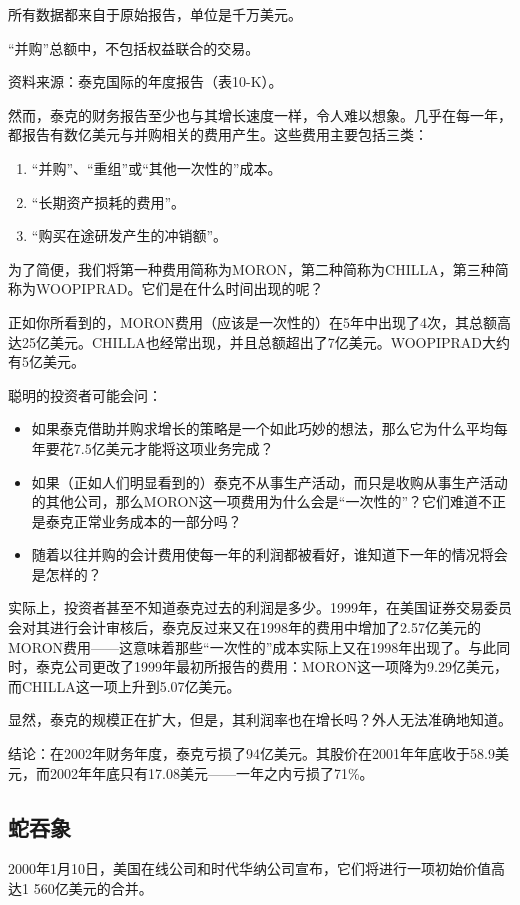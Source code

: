 \documentclass[12pt,oneside]{book}
\begin{document}
所有数据都来自于原始报告，单位是千万美元。

“并购”总额中，不包括权益联合的交易。

资料来源：泰克国际的年度报告（表10-K）。

然而，泰克的财务报告至少也与其增长速度一样，令人难以想象。几乎在每一年，都报告有数亿美元与并购相关的费用产生。这些费用主要包括三类：

\begin{enumerate}
\item “并购”、“重组”或“其他一次性的”成本。
\item “长期资产损耗的费用”。
\item “购买在途研发产生的冲销额”。
\end{enumerate}

为了简便，我们将第一种费用简称为MORON，第二种简称为CHILLA，第三种简称为WOOPIPRAD。它们是在什么时间出现的呢？

正如你所看到的，MORON费用（应该是一次性的）在5年中出现了4次，其总额高达25亿美元。CHILLA也经常出现，并且总额超出了7亿美元。WOOPIPRAD大约有5亿美元。

聪明的投资者可能会问：
\begin{itemize}
\item 如果泰克借助并购求增长的策略是一个如此巧妙的想法，那么它为什么平均每年要花7.5亿美元才能将这项业务完成？
\item 如果（正如人们明显看到的）泰克不从事生产活动，而只是收购从事生产活动的其他公司，那么MORON这一项费用为什么会是“一次性的”？它们难道不正是泰克正常业务成本的一部分吗？
\item 随着以往并购的会计费用使每一年的利润都被看好，谁知道下一年的情况将会是怎样的？
\end{itemize}

实际上，投资者甚至不知道泰克过去的利润是多少。1999年，在美国证券交易委员会对其进行会计审核后，泰克反过来又在1998年的费用中增加了2.57亿美元的MORON费用——这意味着那些“一次性的”成本实际上又在1998年出现了。与此同时，泰克公司更改了1999年最初所报告的费用：MORON这一项降为9.29亿美元，而CHILLA这一项上升到5.07亿美元。

显然，泰克的规模正在扩大，但是，其利润率也在增长吗？外人无法准确地知道。

结论：在2002年财务年度，泰克亏损了94亿美元。其股价在2001年年底收于58.9美元，而2002年年底只有17.08美元——一年之内亏损了71\%。

\subsection{蛇吞象}
2000年1月10日，美国在线公司和时代华纳公司宣布，它们将进行一项初始价值高达1 560亿美元的合并。
\end{document}
